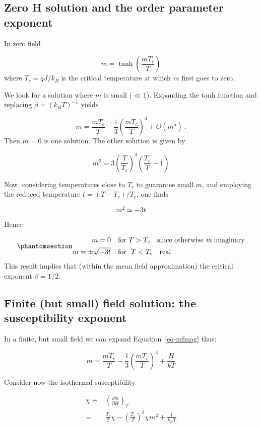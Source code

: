 \documentclass[
  letterpaper,
  enabledeprecatedfontcommands]{report}
\begin{document}
\subsection{Zero H solution and the order parameter
exponent}\label{zero-h-solution-and-the-order-parameter-exponent}

In zero field

\[m=\tanh(\frac{mT_c}{T})\] where \(T_c=qJ/k_B\) is the critical
temperature at which \(m\) first goes to zero.

We look for a solution where \(m\) is small (\(\ll 1\)). Expanding the
tanh function and replacing \(\beta=(k_BT)^{-1}\) yields

\[m=\frac{mT_c}{T}-\frac{1}{3}\left(\frac{mT_c}{T} \right)^3 +O(m^5)\:.\]
Then \(m=0\) is one solution. The other solution is given by

\[m^2=3\left(\frac{T}{T_c} \right)^3\left(\frac{T_c}{T} -1\right)\]

Now, considering temperatures close to \(T_c\) to guarantee small \(m\),
and employing the reduced temperature \(t=(T-T_c)/T_c\), one finds

\[m^2\simeq -3t\]

Hence

\begin{equation}\phantomsection\label{eq-mbeta}{\begin{aligned}
m= 0  &    ~~~\textrm{for } T>T_c \:\:\:  \textrm{ since~otherwise~{\it m}~imaginary}\nonumber\\
m= \pm\sqrt{-3t} & ~~\textrm{ for}  \:\:\: T<T_c ~~\textrm{ real}
\end{aligned} }\end{equation} This result implies that (within the mean
field approximation) the critical exponent \(\beta=1/2\).

\subsection{Finite (but small) field solution: the susceptibility
exponent}\label{sec:closerlook}

In a finite, but small field we can expand Equation~\ref{eq-mfmag} thus:

\[m=\frac{mT_c}{T}-\frac{1}{3}\left(\frac{mT_c}{T} \right)^3 +\frac{H}{kT}\]

Consider now the isothermal susceptibility

\[
\begin{aligned}
\chi  \equiv & \left(\frac{\partial m}{\partial H}\right)_T\\
      =     & \frac{T_c}{T}\chi - \left(\frac{T_c}{T}\right)^3 \chi m^2 + \frac{1}{k_BT}  
\end{aligned}
\]
\end{document}
